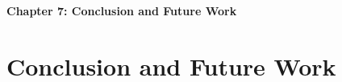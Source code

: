\cleardoublepage %
\thispagestyle{plain}

\vspace*{\fill}
\begin{center}
    {\Huge\bfseries Chapter 7: Conclusion and Future Work \par}
    \vspace{1cm}
\end{center}
\vspace*{\fill}

\clearpage

\chapter{Conclusion and Future Work}
\label{chap:conclusion_future_work}





